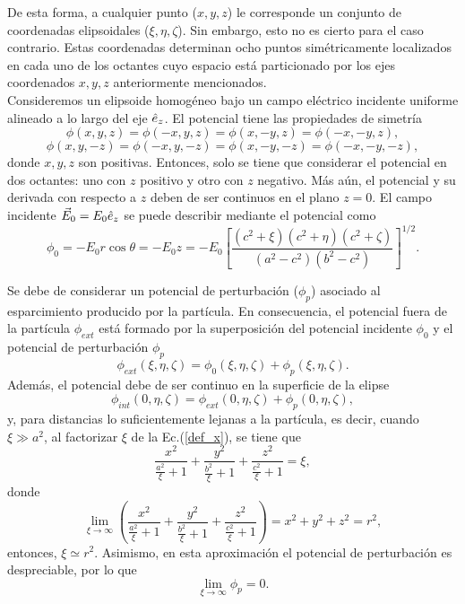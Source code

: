De esta forma, a cualquier punto ($x,y,z$) le corresponde un conjunto de coordenadas elipsoidales ($\xi,\eta,\zeta$). Sin embargo, esto no es cierto para el caso contrario. Estas coordenadas determinan ocho puntos simétricamente localizados en cada uno de los octantes cuyo espacio está particionado por los ejes coordenados $x,y,z$ anteriormente mencionados.\\

Consideremos un elipsoide homogéneo bajo un campo eléctrico incidente uniforme alineado a lo largo del eje $\hat{e}_{z}$. El potencial tiene las propiedades de simetría
\begin{equation}
    \phi(x,y,z)=\phi(-x,y,z)=\phi(x,-y,z)=\phi(-x,-y,z),
\end{equation}
\begin{equation}
    \phi(x,y,-z)=\phi(-x,y,-z)=\phi(x,-y,-z)=\phi(-x,-y,-z),
\end{equation}
donde $x,y,z$ son positivas. Entonces, solo se tiene que considerar el potencial en dos octantes: uno con $z$ positivo y otro con $z$ negativo. Más aún, el potencial y su derivada con respecto a $z$ deben de ser continuos en el plano $z=0$. El campo incidente $\Vec{E}_0=E_0\hat{e}_{z}$ se puede describir mediante el potencial como
\begin{equation}
\phi_0=-E_0 r\cos\theta=-E_0 z=-E_0\left[\frac{(c^2+\xi)(c^2+\eta)(c^2+\zeta)}{(a^2-c^2)(b^2-c^2)}\right]^{1/2}. 
\label{pot_0}
\end{equation}


Se debe de considerar un potencial de perturbación ($\phi_p$) asociado al esparcimiento producido por la partícula. En consecuencia, el potencial fuera de la partícula $\phi_{ext}$ está formado por la superposición del potencial incidente $\phi_0$ y el potencial de perturbación $\phi_p$
\begin{equation}
\phi_{ext}(\xi,\eta,\zeta)=\phi_0(\xi,\eta,\zeta)+\phi_p(\xi,\eta,\zeta).    
\end{equation}
Además, el potencial debe de ser continuo en la superficie de la elipse
\begin{equation}
\phi_{int}(0,\eta,\zeta)=\phi_{ext}(0,\eta,\zeta)+\phi_p(0,\eta,\zeta),    
\end{equation}
y, para distancias lo suficientemente lejanas a la partícula, es decir, cuando $\xi\gg a^2$, al factorizar $\xi$ de  la Ec.(\ref{def_x}), se tiene que 
\begin{equation*}
    \frac{x^2}{\frac{a^2}{\xi}+1}+\frac{y^2}{\frac{b^2}{\xi}+1}+\frac{z^2}{\frac{c^2}{\xi}+1}=\xi,
\end{equation*}
donde
\begin{equation*}
    \lim_{\xi\rightarrow\infty}\left(\frac{x^2}{\frac{a^2}{\xi}+1}+\frac{y^2}{\frac{b^2}{\xi}+1}+\frac{z^2}{\frac{c^2}{\xi}+1}\right)=x^2+y^2+z^2=r^2,
\end{equation*}
entonces, $\xi \simeq r^2$. Asimismo, en esta aproximación el potencial de perturbación es despreciable, por lo que 
\begin{equation}
\lim_{\xi\rightarrow\infty}\phi_p=0
\label{limitephi_p}.
\end{equation}

